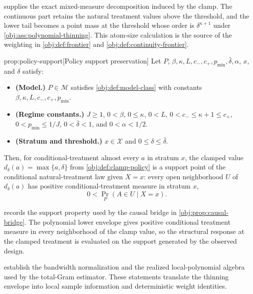 \documentclass[11pt]{article}
\begin{document}
 supplies the exact mixed-measure decomposition induced by the clamp. The continuous part retains the natural treatment values above the threshold, and the lower tail becomes a point mass at the threshold whose order is \(\delta^{\kappa+1}\) under \cref{obj:ass:polynomial-thinning}. This atom-size calculation is the source of the weighting in \cref{obj:def:frontier} and \cref{obj:def:continuity-frontier}.

\begin{propositionv}{prop:policy-support}[Policy support preservation]
Let \(P\), \(\beta,\kappa,L,c_-,c_+,p_{\min},\bar\delta,\alpha\), \(x\), and \(\delta\) satisfy:
\begin{itemize}
\item \textbf{(Model.)} \(P\in\mathcal M\) satisfies \cref{obj:def:model-class} with constants \(\beta,\kappa,L,c_-,c_+,p_{\min}\).
\item \textbf{(Regime constants.)} \(J\ge 1\), \(0<\beta\), \(0\le \kappa\), \(0<L\), \(0<c_-\le \kappa+1\le c_+\), \(0<p_{\min}\le 1/J\), \(0<\bar\delta<1\), and \(0<\alpha<1/2\).
\item \textbf{(Stratum and threshold.)} \(x\in\mathcal X\) and \(0\le \delta\le \bar\delta\).
\end{itemize}
Then, for conditional-treatment almost every \(a\) in stratum \(x\), the clamped value \(d_\delta(a)=\max\{a,\delta\}\) from \cref{obj:def:clamp-policy} is a support point of the conditional natural-treatment law given \(X=x\): every open neighborhood \(U\) of \(d_\delta(a)\) has positive conditional-treatment measure in stratum \(x\),
\[
0<\Pr_P(A\in U\mid X=x).
\]
\end{propositionv}

 records the support property used by the causal bridge in \cref{obj:prop:causal-bridge}. The polynomial lower envelope gives positive conditional treatment measure in every neighborhood of the clamp value, so the structural response at the clamped treatment is evaluated on the support generated by the observed design.

 establish the bandwidth normalization and the realized local-polynomial algebra used by the total-Gram estimator. These statements translate the thinning envelope into local sample information and deterministic weight identities.
\end{document}
